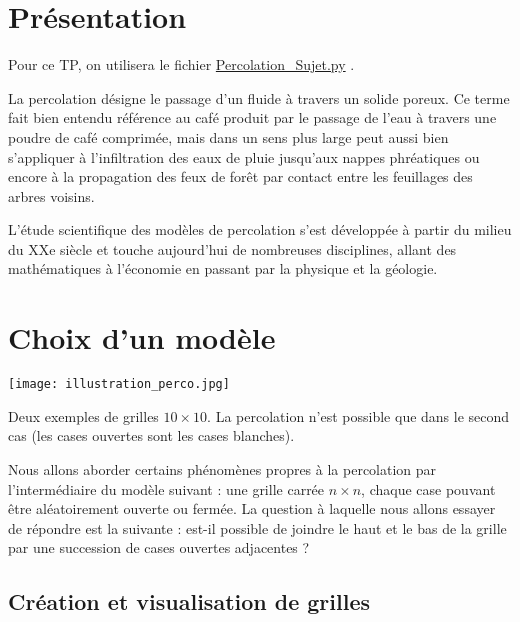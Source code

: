 
\section*{Présentation}
Pour ce TP, on utilisera le fichier \href{https://ptsilamartin.github.io/info/TP/Percolation_sujet.py}{Percolation\_Sujet.py} .

La percolation  désigne le passage d'un fluide à
travers un solide poreux. Ce terme fait bien entendu référence au café 
produit par le passage de l'eau à travers une poudre de café comprimée,
mais dans un sens plus large peut aussi bien s'appliquer à
l'infiltration des eaux de pluie jusqu'aux nappes phréatiques ou encore
à la propagation des feux de forêt par contact entre les feuillages des
arbres voisins.

L'étude scientifique des modèles de percolation s'est développée à
partir du milieu du XXe siècle et touche aujourd'hui de nombreuses
disciplines, allant des mathématiques à l'économie en passant par la
physique et la géologie.

\section*{Choix d'un modèle}\label{choix-dun-modele}


\begin{marginfigure}
\texttt{[image: illustration\_perco.jpg]}
\caption{Deux exemples de grilles $10\times10$. La percolation
n'est possible que dans le second cas (les cases ouvertes sont les cases
blanches). \label{fig1}}
\end{marginfigure}

Nous allons aborder certains phénomènes propres à la percolation par
l'intermédiaire du modèle suivant : une grille carrée $n\times n$,
chaque case pouvant être aléatoirement ouverte ou fermée.
La question à laquelle nous
allons essayer de répondre est la suivante : est-il possible de joindre
le haut et le bas de la grille par une succession de cases ouvertes
adjacentes ?



\subsection*{Création et visualisation de grilles}


